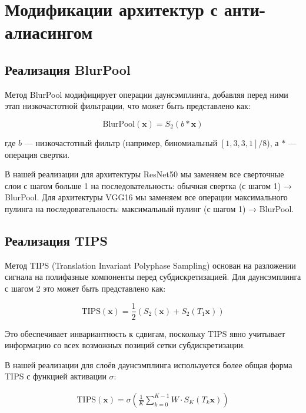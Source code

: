 \section{Модификации архитектур с анти-алиасингом}
\label{methods:architectures}

\subsection{Реализация BlurPool}
\label{methods:architectures:blurpool}

Метод BlurPool модифицирует операции даунсэмплинга, добавляя перед ними этап низкочастотной фильтрации, что может быть представлено как:

\begin{equation}
\text{BlurPool}(\mathbf{x}) = S_2(b * \mathbf{x})
\end{equation}

где $b$ — низкочастотный фильтр (например, биномиальный $[1, 3, 3, 1]/8$), а $*$ — операция свертки. 

В нашей реализации для архитектуры ResNet50 мы заменяем все сверточные слои с шагом больше 1 на последовательность: обычная свертка (с шагом 1) → BlurPool. Для архитектуры VGG16 мы заменяем все операции максимального пулинга на последовательность: максимальный пулинг (с шагом 1) → BlurPool.

\subsection{Реализация TIPS}
\label{methods:architectures:tips}

Метод TIPS (Translation Invariant Polyphase Sampling) основан на разложении сигнала на полифазные компоненты перед субдискретизацией. Для даунсэмплинга с шагом 2 это может быть представлено как:

\begin{equation}
\text{TIPS}(\mathbf{x}) = \frac{1}{2}(S_2(\mathbf{x}) + S_2(T_1 \mathbf{x}))
\end{equation}

Это обеспечивает инвариантность к сдвигам, поскольку TIPS явно учитывает информацию со всех возможных позиций сетки субдискретизации.

В нашей реализации для слоёв даунсэмплинга используется более общая форма TIPS с функцией активации $\sigma$:

\begin{multline}
\text{TIPS}(\mathbf{x}) = \sigma\left(\frac{1}{K}\sum_{k=0}^{K-1} W \cdot S_K(T_k \mathbf{x})\right)
\end{multline}

